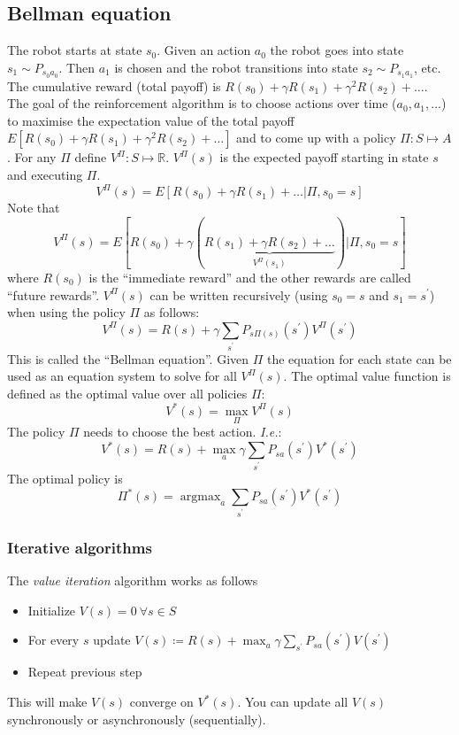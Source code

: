\documentclass{article}
\begin{document}
\subsection{Bellman equation}
The robot starts at state $s_0$.
Given an action $a_0$ the robot goes into state $s_1 \sim P_{s_0 a_0}$.
Then $a_1$ is chosen and the robot transitions into state $s_2 \sim P_{s_1 a_1}$, etc.
The cumulative reward (total payoff) is $R(s_0)+\gamma R(s_1)+\gamma^2 R(s_2)+\ldots$.
The goal of the reinforcement algorithm is to choose actions over time ($a_0,a_1,\ldots$)
to maximise the expectation value of the total payoff $E[R(s_0)+\gamma R(s_1)+\gamma^2 R(s_2)+\ldots]$ and
to come up with a policy $\Pi:S\mapsto A$.
For any $\Pi$ define $V^\Pi:S\mapsto \mathbb{R}$.
$V^\Pi(s)$ is the expected payoff starting in state $s$ and executing $\Pi$.
\begin{equation}
  V^\Pi(s)=E[R(s_0)+\gamma R(s_1)+\ldots|\Pi,s_0=s]
\end{equation}
Note that
\begin{equation}
  V^\Pi(s)=E[R(s_0)+\gamma(\underbrace{R(s_1)+\gamma R(s_2)+\ldots}_{V^\Pi(s_1)})|\Pi,s_0=s]
\end{equation}
where $R(s_0)$ is the ``immediate reward'' and the other rewards are called ``future rewards''.
$V^\Pi(s)$ can be written recursively (using $s_0=s$ and $s_1=s^\prime$) when using the policy $\Pi$ as follows:
\begin{equation}
  V^\Pi(s)=R(s)+\gamma \sum_{s^\prime} P_{s\Pi(s)}(s^\prime) V^\Pi(s^\prime)
\end{equation}
This is called the ``Bellman equation''.
Given $\Pi$ the equation for each state can be used as an equation system to solve for all $V^\Pi(s)$.
The optimal value function is defined as the optimal value over all policies $\Pi$:
\begin{equation}
  V^\ast(s)=\max_\Pi V^\Pi(s)
\end{equation}
The policy $\Pi$ needs to choose the best action. \emph{I.e.}:
\begin{equation}
  V^\ast(s)=R(s)+\max_a \gamma \sum_{s^\prime} P_{sa}(s^\prime) V^\ast(s^\prime)
\end{equation}
The optimal policy is
\begin{equation}
  \Pi^\ast(s)=\mathop{\operatorname{argmax}}_a \sum_{s^\prime} P_{sa}(s^\prime)V^\ast(s^\prime)
\end{equation}

\subsubsection{Iterative algorithms}
The \emph{value iteration} algorithm works as follows
\begin{itemize}
  \item Initialize $V(s)=0\mathrm{\ }\forall s\in S$
  \item For every $s$ update $V(s)\coloneqq R(s) + \max_a \gamma \sum_{s^\prime} P_{sa}(s^\prime) V(s^\prime)$
  \item Repeat previous step
\end{itemize}
This will make $V(s)$ converge on $V^\ast(s)$.
You can update all $V(s)$ synchronously or asynchronously (sequentially).
\end{document}
